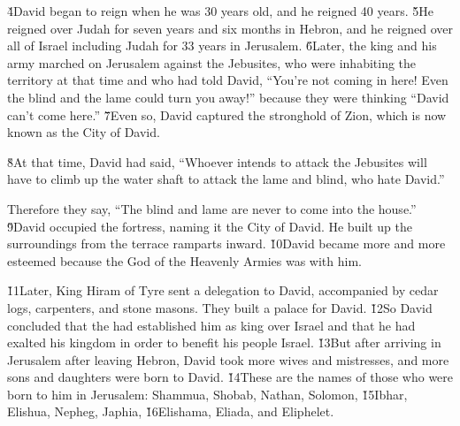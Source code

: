 \v{4}David began to reign when he was 30 years old, and he reigned 40 years. \v{5}He reigned over Judah for seven years and six months in Hebron, and he reigned over all of Israel including Judah for 33 years in Jerusalem. \v{6}Later, the king and his army marched on Jerusalem against the Jebusites, who were inhabiting the territory at that time and who had told David, ``You're not coming in here! Even the blind and the lame could turn you away!'' because they were thinking ``David can't come here.'' \v{7}Even so, David captured the stronghold of Zion, which is now known as the City of David.

\v{8}At that time, David had said, ``Whoever intends to attack the Jebusites will have to climb up the water shaft to attack the lame and blind, who hate David.''

Therefore they say, ``The blind and lame are never to come into the house.'' \v{9}David occupied the fortress, naming it the City of David. He built up the surroundings from the terrace ramparts inward. \v{10}David became more and more esteemed because the  God of the Heavenly Armies was with him.

\v{11}Later, King Hiram of Tyre sent a delegation to David, accompanied by cedar logs, carpenters, and stone masons. They built a palace for David. \v{12}So David concluded that the  had established him as king over Israel and that he had exalted his kingdom in order to benefit his people Israel. \v{13}But after arriving in Jerusalem after leaving Hebron, David took more wives and mistresses, and more sons and daughters were born to David. \v{14}These are the names of those who were born to him in Jerusalem: Shammua, Shobab, Nathan, Solomon, \v{15}Ibhar, Elishua, Nepheg, Japhia, \v{16}Elishama, Eliada, and Eliphelet.

